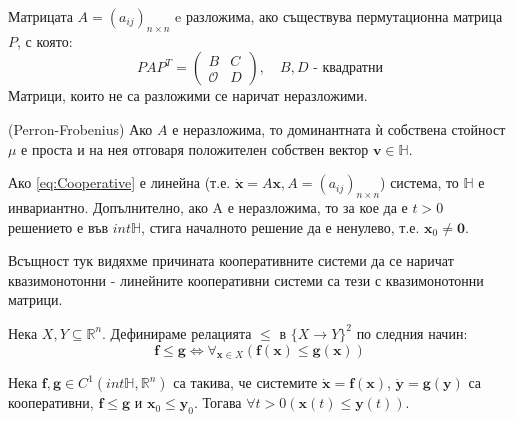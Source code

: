 \begin{definition}
  Матрицата $A=(a_{ij})_{n \times n}$ e разложима, ако съществува пермутационна матрица $P$, с която:
  \begin{equation*}
    PAP^T =
    \begin{pmatrix}
      B & C \\
      \mathscr{O} & D
    \end{pmatrix}, \quad B, D \text{ - квадратни}
  \end{equation*}
  Матрици, които не са разложими се наричат неразложими.
\end{definition}

\begin{theorem}(Perron-Frobenius)
  Ако $A$ е неразложима, то доминантната ѝ собствена стойност $\mu$ е проста и на нея отговаря положителен собствен вектор $\mathbf{v} \in \mathbb{H}$.
\end{theorem}

\begin{theorem}
  Ако \ref{eq:Cooperative} е линейна (т.е. $\dot{\mathbf{x}} = A \mathbf{x}, A = (a_{ij})_{n \times n}$) система, то $\mathbb{H}$ е инвариантно. Допълнително, ако A е неразложима, то за кое да е $t > 0$ решението е във $int \mathbb{H}$, стига началното решение да е ненулево, т.е. $\mathbf{x}_0 \neq \mathbf{0}$.
\end{theorem}

Всъщност тук видяхме причината кооперативните системи да се наричат квазимонотонни - линейните кооперативни системи са тези с квазимонотонни матрици.

\begin{definition}
  Нека $X, Y \subseteq \mathbb{R}^n$. Дефинираме релацията $\leq$ в $\{X \rightarrow Y\}^2$ по следния начин:
  \begin{equation*}
    \mathbf{f} \leq \mathbf{g} \iff \forall_{\mathbf{x} \in X} (\mathbf{f}(\mathbf{x}) \leq \mathbf{g}(\mathbf{x}))
  \end{equation*}
\end{definition}

\begin{theorem}
  \label{thm:Comparison}
  Нека $\mathbf{f}, \mathbf{g} \in C^1(int \mathbb{H}, \mathbb{R}^n)$ са такива, че системите $\dot{\mathbf{x}}=\mathbf{f}(\mathbf{x})$, $\dot{\mathbf{y}}=\mathbf{g}(\mathbf{y})$ са кооперативни, $\mathbf{f} \leq \mathbf{g}$ и $\mathbf{x}_0 \leq \mathbf{y}_0$. Тогава $\forall{t>0}(\mathbf{x}(t) \leq \mathbf{y}(t))$.
\end{theorem}

